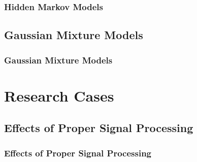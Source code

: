 \documentclass{beamer}
\newcommand{\linespace}{\vskip 0.25cm}
\begin{document}
\begin{frame}
	\frametitle{Hidden Markov Models}
	
\end{frame}

\subsection{Gaussian Mixture Models}

\begin{frame}
	\frametitle{Gaussian Mixture Models}
	
\end{frame}

\section[Research Cases]{Research Cases}

\subsection[Effects of Proper Signal Processing]{Effects of Proper Signal Processing}

\begin{frame}
  \frametitle{Effects of Proper Signal Processing}
  

  
  
  
\end{frame}
\end{document}
